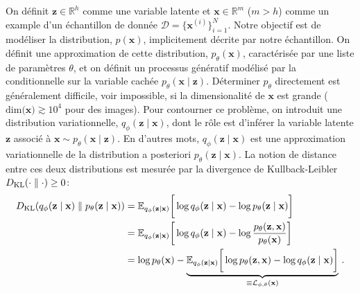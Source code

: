 On définit $\mathbf{z}\in \mathbb{R}^{h}$ comme une variable latente et $\mathbf{x}\in \mathbb{R}^{m}$ ($m > h$) 
comme un example d'un échantillon de donnée $\mathcal{D} = \{\mathbf{x}^{(i)}\}_{i=1}^{N}$. 
Notre objectif est de modéliser la distribution, $p(\mathbf{x})$, implicitement décrite par notre échantillon. 
On définit une approximation de cette distribution, $p_\theta(\mathbf{x})$, caractérisée par une liste de paramètres $\theta$,
et on définit un processus génératif modélisé par la conditionnelle sur la variable cachée $p_\theta(\mathbf{x \mid \mathbf{z}})$. 
Déterminer $p_\theta$ directement est généralement difficile, voir impossible, si la dimensionalité de $\mathbf{x}$ est grande 
($\mathrm{dim(\mathbf{x}}) \gtrsim 10^{4}$ pour des images). 
Pour contourner ce problème, on introduit une distribution variationnelle, $q_\phi(\mathbf{z} \mid \mathbf{x})$, dont le rôle est 
d'inférer la variable latente $\mathbf{z}$ associé à $\mathbf{x} \sim p_\theta(\mathbf{x} \mid \mathbf{z})$. 
En d'autres mots, $q_\phi(\mathbf{z} \mid \mathbf{x})$ est une approximation variationnelle de la distribution a posteriori $p_\theta(\mathbf{z} \mid \mathbf{x})$.
La notion de distance entre ces deux distributions est mesurée par la divergence de Kullback-Leibler $D_{\mathrm{KL}}(\cdot \mathrel{\Vert} \cdot) \geq 0$: 
\begin{align}
        \nonumber
       D_{\mathrm{KL}}(q_\phi(\mathbf{z} \mid \mathbf{x}) \mathrel{\Vert}  p_\theta (\mathbf{z} \mid \mathbf{x})) 
       &= \mathbb{E}_{q_\phi(\mathbf{z} \mid \mathbf{x})} \bigg[\log q_\phi(\mathbf{z} \mid \mathbf{x}) - \log p_\theta (\mathbf{z} \mid \mathbf{x}) \bigg]  \\
       \nonumber
       &= \mathbb{E}_{q_\phi(\mathbf{z} \mid \mathbf{x})} \bigg[\log q_\phi (\mathbf{z} \mid \mathbf{x}) -\log \frac{p_\theta(\mathbf{z}, \mathbf{x})}{p_\theta(\mathbf{x})} \bigg]  \\
       \label{eq:KL}
       &= \log p_\theta (\mathbf{x}) - \underbrace{\mathbb{E}_{q_\phi(\mathbf{z} \mid \mathbf{x})} \bigg[\log p_\theta(\mathbf{z}, \mathbf{x}) - \log q_\phi (\mathbf{z} \mid \mathbf{x}) \bigg]}_{\equiv \mathcal{L}_{\phi,\theta}(\mathbf{x})} \, .
\end{align} 

